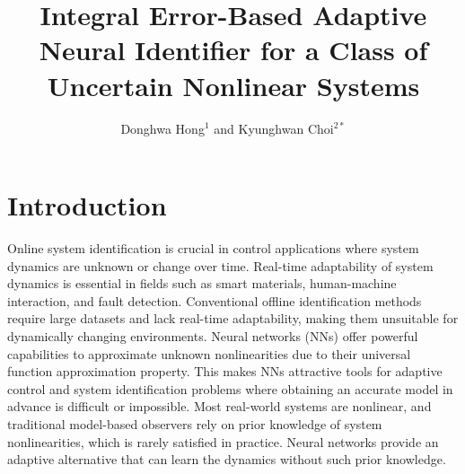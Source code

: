\documentclass[10pt,twocolumn]{ICCAS}
\begin{document}
\title{Integral Error-Based Adaptive Neural Identifier for a Class of Uncertain Nonlinear Systems}

\author{Donghwa Hong${}^{1}$ and Kyunghwan Choi${}^{2*}$ }





\maketitle

\section{Introduction}
Online system identification is crucial in control applications where system dynamics are unknown or change over time. Real-time adaptability of system dynamics is essential in fields such as smart materials, human-machine interaction, and fault detection. Conventional offline identification methods require large datasets and lack real-time adaptability, making them unsuitable for dynamically changing environments.
Neural networks (NNs) offer powerful capabilities to approximate unknown nonlinearities due to their universal function approximation property. This makes NNs attractive tools for adaptive control and system identification problems where obtaining an accurate model in advance is difficult or impossible.
Most real-world systems are nonlinear, and traditional model-based observers rely on prior knowledge of system nonlinearities, which is rarely satisfied in practice. Neural networks provide an adaptive alternative that can learn the dynamics without such prior knowledge.
\end{document}

